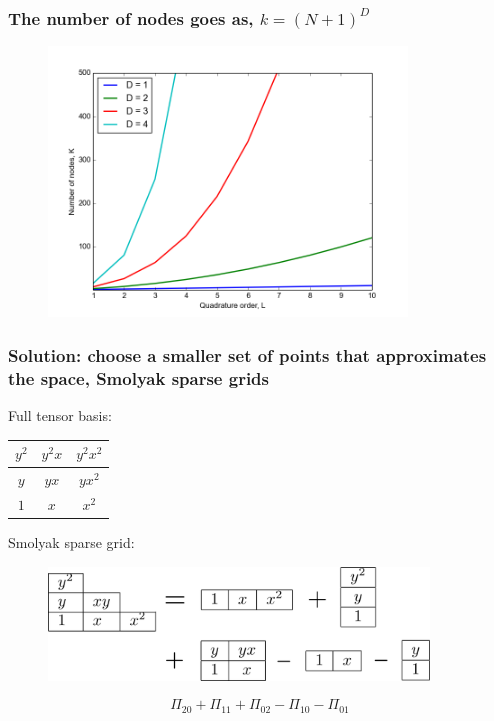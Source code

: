 \documentclass{beamer}
\begin{document}
\begin{frame}
 \frametitle{The number of nodes goes as, $k = (N+1)^D$}
 \begin{figure}
  \includegraphics[width=0.85\textwidth]{dimensionality_nodes.png}
 \end{figure}
\end{frame}

\begin{frame}
 \frametitle{Solution: choose a smaller set of points that approximates the space, Smolyak sparse grids}

Full tensor basis:
\begin{table}
 \begin{tabular}{|c|c|c|}\hline
 $y^2$&$y^2x$&$y^2x^2$\\\hline
 $y$&$yx$&$yx^2$\\\hline
 $1$&$x$&$x^2$\\\hline
 \end{tabular}
\end{table}
\pause
Smolyak sparse grid:
 \begin{figure}
  \includegraphics[width=0.9\textwidth]{smolyak2.png}
 \end{figure}
\[\Pi_{20} + \Pi_{11} + \Pi_{02} - \Pi_{10} - \Pi_{01}\]
\end{frame}
\end{document}
